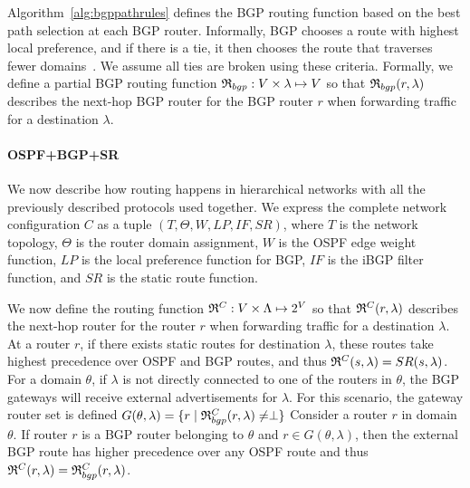 Algorithm~\ref{alg:bgppathrules} defines the BGP routing function
based on the best path selection at each BGP router. 
Informally, BGP 
chooses a route with highest local preference, and
if there is a tie, it then chooses the route that traverses fewer domains~\cite{bgp}. 
We assume all ties 
are broken using these criteria. 
Formally, we define a partial BGP routing function 
$\mathfrak{R}_{bgp}: V \times \lambda \mapsto V$
so that
$\mathfrak{R}_{bgp}(r,\lambda)$
 describes the next-hop BGP router for
 the BGP
router $r$ when forwarding traffic for a destination $\lambda$. 

\paragraph{OSPF+BGP+SR} We now describe how routing
happens in hierarchical networks with all the previously described protocols
used together.
We express the complete network configuration $C$
as a tuple $(T, \Theta,W,LP,IF,SR)$, where $T$ is the 
network topology, $\Theta$ is
the router domain assignment, $W$ is the OSPF
edge weight function,
$LP$  is the local preference function for BGP,
$IF$  is 
 the iBGP filter function, and 
 $SR$ is the static route
function.  

We now define the routing function 
$\mathfrak{R}^C: V \times \Lambda \mapsto 2^V$ 
so that
$\mathfrak{R}^C(r,\lambda)$
 describes the next-hop router for
 the 
router $r$ when forwarding traffic for a destination $\lambda$. 
At a router $r$, if there exists 
static routes for destination $\lambda$,
these routes take highest precedence over OSPF and BGP routes, 
and thus $\mathfrak{R}^C(s, \lambda) = SR(s, \lambda)$.
For a domain $\theta$, if $\lambda$ is not directly 
connected to one of the routers in $\theta$, the BGP 
gateways will receive external advertisements for $\lambda$.
For this scenario, the gateway router set is defined 
$G(\theta, \lambda) = \{r \mid \mathfrak{R}^C_{bgp}(r, \lambda) \not= \perp\}$
Consider a router $r$ in domain $\theta$. 
If router $r$ is a BGP router belonging to $\theta$ and $r \in G (\theta, \lambda)$, then the external BGP route has higher
precedence over any OSPF route and thus $\mathfrak{R}^C(r, \lambda)=\mathfrak{R}^C_{bgp}(r, \lambda)$. 

